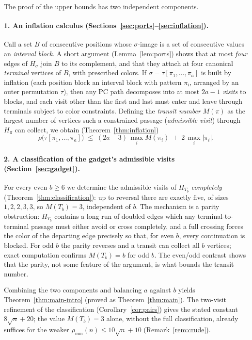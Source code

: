 \documentclass[11pt]{article}
\theoremstyle{definition}
\newcommand{\pmin}{\rho_{\min}}
\begin{document}
The proof of the upper bounds has two independent components.

\paragraph{1. An inflation calculus (Sections~\ref{sec:ports}--\ref{sec:inflation}).}
Call a set $B$ of consecutive positions whose $\sigma$-image is a set of consecutive
values an \emph{interval block}. A short argument (Lemma~\ref{lem:ports}) shows that at
most \emph{four} edges of $H_\sigma$ join $B$ to its complement, and that they attach
at four canonical \emph{terminal} vertices of $B$, with prescribed colors. If
$\sigma = \tau[\pi_1,\dots,\pi_a]$ is built by inflation (each position block an
interval block with pattern $\pi_i$, arranged by an outer permutation $\tau$), then any
PC path decomposes into at most $2a-1$ \emph{visits} to blocks, and each visit other
than the first and last must enter and leave through terminals subject to color
constraints. Defining the \emph{transit number} $M(\pi)$ as the largest number of
vertices such a constrained passage (\emph{admissible visit}) through $H_\pi$ can
collect, we obtain (Theorem~\ref{thm:inflation})
\[
\rho\bigl(\tau[\pi_1,\dots,\pi_a]\bigr) \;\le\; (2a-3)\,\max_i M(\pi_i) \;+\;
2\,\max_i |\pi_i| .
\]

\paragraph{2. A classification of the gadget's admissible visits
(Section~\ref{sec:gadget}).}
For every even $b \ge 6$ we determine the admissible visits of $H_{T_b}$
\emph{completely} (Theorem~\ref{thm:classification}): up to reversal there are exactly
five, of sizes $1, 2, 2, 3, 3$, so $M(T_b) = 3$, independent of $b$. The mechanism is a
parity obstruction: $H_{T_b}$ contains a long run of doubled edges which any
terminal-to-terminal passage must either avoid or cross completely, and a full crossing
forces the color of the departing edge precisely so that, for even $b$, every
continuation is blocked. For odd $b$ the parity reverses and a transit can collect all
$b$ vertices; exact computation confirms $M(T_b) = b$ for odd $b$. The even/odd
contrast shows that the parity, not some feature of the argument, is what bounds the
transit number.

Combining the two components and balancing $a$ against $b$ yields
Theorem~\ref{thm:main-intro} (proved as Theorem~\ref{thm:main}). The two-visit
refinement of the classification (Corollary~\ref{cor:pairs}) gives the stated constant
$8\sqrt n + 20$; the value $M(T_b) = 3$ alone, without the full classification, already
suffices for the weaker $\pmin(n) \le 10\sqrt n + 10$ (Remark~\ref{rem:crude}).
\end{document}
